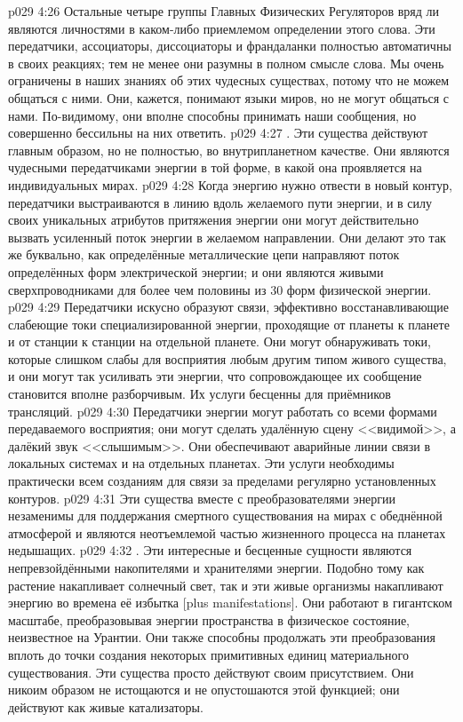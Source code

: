 \vs p029 4:26 \pc Остальные четыре группы Главных Физических Регуляторов вряд ли являются личностями в каком\hyp{}либо приемлемом определении этого слова. Эти передатчики, ассоциаторы, диссоциаторы и франдаланки полностью автоматичны в своих реакциях; тем не менее они разумны в полном смысле слова. Мы очень ограничены в наших знаниях об этих чудесных существах, потому что не можем общаться с ними. Они, кажется, понимают языки миров, но не могут общаться с нами. По\hyp{}видимому, они вполне способны принимать наши сообщения, но совершенно бессильны на них ответить.
\vs p029 4:27 . Эти существа действуют главным образом, но не полностью, во внутрипланетном качестве. Они являются чудесными передатчиками энергии в той форме, в какой она проявляется на индивидуальных мирах.
\vs p029 4:28 Когда энергию нужно отвести в новый контур, передатчики выстраиваются в линию вдоль желаемого пути энергии, и в силу своих уникальных атрибутов притяжения энергии они могут действительно вызвать усиленный поток энергии в желаемом направлении. Они делают это так же буквально, как определённые металлические цепи направляют поток определённых форм электрической энергии; и они являются живыми сверхпроводниками для более чем половины из 30 форм физической энергии.
\vs p029 4:29 Передатчики искусно образуют связи, эффективно восстанавливающие слабеющие токи специализированной энергии, проходящие от планеты к планете и от станции к станции на отдельной планете. Они могут обнаруживать токи, которые слишком слабы для восприятия любым другим типом живого существа, и они могут так усиливать эти энергии, что сопровождающее их сообщение становится вполне разборчивым. Их услуги бесценны для приёмников трансляций.
\vs p029 4:30 Передатчики энергии могут работать со всеми формами передаваемого восприятия; они могут сделать удалённую сцену <<видимой>>, а далёкий звук <<слышимым>>. Они обеспечивают аварийные линии связи в локальных системах и на отдельных планетах. Эти услуги необходимы практически всем созданиям для связи за пределами регулярно установленных контуров.
\vs p029 4:31 Эти существа вместе с преобразователями энергии незаменимы для поддержания смертного существования на мирах с обеднённой атмосферой и являются неотъемлемой частью жизненного процесса на планетах недышащих.
\vs p029 4:32 . Эти интересные и бесценные сущности являются непревзойдёнными накопителями и хранителями энергии. Подобно тому как растение накапливает солнечный свет, так и эти живые организмы накапливают энергию во времена её избытка [plus manifestations]. Они работают в гигантском масштабе, преобразовывая энергии пространства в физическое состояние, неизвестное на Урантии. Они также способны продолжать эти преобразования вплоть до точки создания некоторых примитивных единиц материального существования. Эти существа просто действуют своим присутствием. Они никоим образом не истощаются и не опустошаются этой функцией; они действуют как живые катализаторы.
